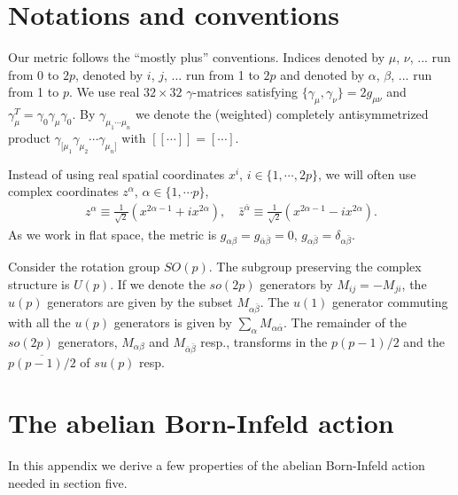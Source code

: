 \documentclass[a4paper,12pt,oneside]{article}
\begin{document}
\appendix

\setcounter{equation}{0}
\section{Notations and conventions}
Our metric follows the ``mostly plus'' conventions. Indices denoted
by $\mu $, $\nu$, ... run from 0 
to $2p$, denoted by $i$, $j$, ... run from 1 to $2p$ and denoted by
$\alpha $, $\beta$, ... run from 1 to $p$. We use real $32\times32$ 
$\gamma$-matrices satisfying $\{\gamma_\mu ,\gamma_\nu\}=2g_{\mu \nu}$ and 
$\gamma_\mu ^T=\gamma_0\gamma_\mu \gamma_0$. By $\gamma_{\mu_1\cdots\mu 
_n}$ we denote the (weighted) completely antisymmetrized product 
$\gamma_{[\mu _1}\gamma_{\mu _2} \cdots\gamma_{\mu _n]}$ with $[[\cdots ]] 
= [\cdots ]$.

Instead of using real spatial coordinates $x^i$, $i\in\{1,\cdots,2p\}$, we 
will often use complex coordinates $z^\alpha $, $\alpha \in\{1,\cdots 
p\}$,
\begin{eqnarray}
z^\alpha \equiv \frac{1}{\sqrt 2}\left(x^{2\alpha -1}+ix^{2\alpha }\right),\quad
\bar z^{\bar\alpha} \equiv \frac{1}{\sqrt 2}
\left(x^{2\alpha -1}-ix^{2\alpha }\right).
\label{cc}
\end{eqnarray}
As we work in flat space, the metric is $g_{\alpha \beta}=g_{\bar\alpha 
\bar\beta}=0$, $g_{\alpha \bar\beta}=\delta_{\alpha \bar\beta}$.

Consider the rotation group $SO(p)$. The subgroup preserving the complex 
structure is $U(p)$. If we denote the $so(2p)$ generators by 
$M_{ij}=-M_{ji}$, the $u(p)$ generators are given by the subset $M_{\alpha 
\bar\beta}$. The $u(1)$ generator commuting with all the $u(p)$ generators 
is given by $\sum_{\alpha }M_{\alpha \bar\alpha }$. The remainder of the 
$so(2p)$ generators, $M_{\alpha \beta}$ and $M_{\bar\alpha \bar\beta}$
resp.,
transforms in the $p(p-1)/2$ and the $\overline{p(p-1)/2}$ of $su(p)$ 
resp.

\setcounter{equation}{0}
\section{The abelian Born-Infeld action}
In this appendix we derive a few properties of the abelian Born-Infeld 
action needed in section five.
\end{document}
